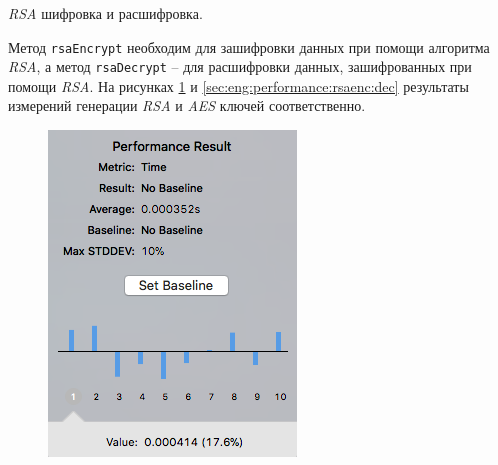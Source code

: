 \subsubsection{} \textit{RSA} шифровка и расшифровка.
\label{sec:eng:performance:rsaenc}

Метод \texttt{rsaEncrypt} необходим для зашифровки данных при помощи алгоритма \textit{RSA}, а метод \texttt{rsaDecrypt} -- для расшифровки данных, зашифрованных при помощи \textit{RSA}. На рисунках \ref{sec:eng:performance:rsaenc:enc} и \ref{sec:eng:performance:rsaenc:dec} результаты измерений генерации \textit{RSA} и \textit{AES} ключей соответственно.

\begin{figure}[h]
\centering
\begin{minipage}{.5\textwidth}
  \centering
  \includegraphics[width=.8\linewidth]{inc/img/perf/testRSAEncryptPerformance.png}
  \label{sec:eng:performance:rsaenc:enc}
\end{minipage}%
\begin{minipage}{.5\textwidth}
  \centering

\end{minipage}
\end{figure}
